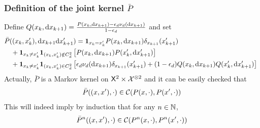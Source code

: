 \documentclass[english,graybox,envcountchap,envcountsame,sectrefs,shortlabels]{svmono}
\theoremstyle{style}
\begin{document}
\subsubsection*{Definition of the joint kernel $\bar P$}
Define $Q(x_k,\mathrm{d} x_{k+1})=\frac{P(x_k,\mathrm{d} x_{k+1})-\epsilon_d \nu_d(\mathrm{d} x_{k+1})}{1-\epsilon_d}$ and set
\begin{align*}
&\bar P( (x_k,x_k'),\mathrm{d} x_{k+1} \mathrm{d} x'_{k+1})=\mathbf{1}_{x_k=x'_k}P(x_k,\mathrm{d} x_{k+1})  \delta_{x_{k+1}} (x'_{k+1}) \\
&\quad + \mathbf{1}_{x_k\neq x'_k } \mathbf{1}_{(x_k,x'_k)\notin C_d^2 }\left[P(x_k,\mathrm{d} x_{k+1})P(x'_k,\mathrm{d} x'_{k+1})\right]\\
&\quad + \mathbf{1}_{x_k\neq x'_k } \mathbf{1}_{(x_k,x'_k)\in C_d^2 }\left[\epsilon_d \nu_d(\mathrm{d} x_{k+1})\delta_{x_{k+1}} (x'_{k+1})+(1-\epsilon_d)Q(x_k,\mathrm{d} x_{k+1})Q(x'_k,\mathrm{d} x'_{k+1})\right]\
\end{align*}
Actually, $\bar P$ is a Markov kernel on $\mathsf{X}^2 \times \mathcal{X}^{\otimes 2}$ and it can be easily checked that
\begin{equation}
\bar P((x,x'),\cdot) \in \mathcal{C} (P(x,\cdot),P(x',\cdot))
\end{equation}
This will indeed imply by induction that for any $n\in\mathbb{N}$,
\begin{equation} \label{eq:coupling:n}
\bar P^n((x,x'),\cdot) \in \mathcal{C} (P^n(x,\cdot),P^n(x',\cdot))
\end{equation}


\end{document}
